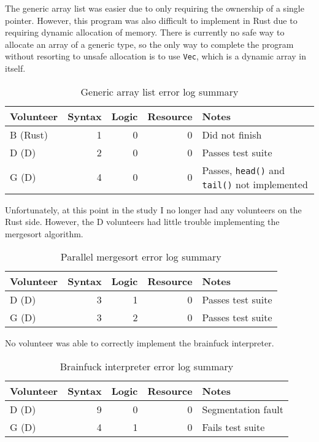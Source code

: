 \documentclass[finalcopy]{srpaper}
\begin{document}
The generic array list was easier due to only requiring the ownership of a
single pointer. However, this program was also difficult to implement in Rust
due to requiring dynamic allocation of memory. There is currently no safe way
to allocate an array of a generic type, so the only way to complete the program
without resorting to unsafe allocation is to use \texttt{Vec}, which is a
dynamic array in itself.

\begin{table}[h]
\centering
\begin{tabular}{lrrrp{5cm}}
\toprule
Volunteer & Syntax & Logic & Resource & Notes \\
\midrule
B (Rust) & 1 & 0 & 0 & Did not finish \\
D (D) & 2 & 0 & 0 & Passes test suite \\
G (D) & 4 & 0 & 0 & Passes, \texttt{head()} and \texttt{tail()} not implemented \\
\bottomrule
\end{tabular}
\caption{Generic array list error log summary}
\label{tab:genericarraylist}
\end{table}

Unfortunately, at this point in the study I no longer had any volunteers on
the Rust side. However, the D volunteers had little trouble implementing the
mergesort algorithm.

\begin{table}[h]
\centering
\begin{tabular}{lrrrp{5cm}}
\toprule
Volunteer & Syntax & Logic & Resource & Notes \\
\midrule
D (D) & 3 & 1 & 0 & Passes test suite \\
G (D) & 3 & 2 & 0 & Passes test suite \\
\bottomrule
\end{tabular}
\caption{Parallel mergesort error log summary}
\label{tab:parallelmergesort}
\end{table}

No volunteer was able to correctly implement the brainfuck interpreter.

\begin{table}[h]
\centering
\begin{tabular}{lrrrp{5cm}}
\toprule
Volunteer & Syntax & Logic & Resource & Notes \\
\midrule
D (D) & 9 & 0 & 0 & Segmentation fault \\
G (D) & 4 & 1 & 0 & Fails test suite \\
\bottomrule
\end{tabular}
\caption{Brainfuck interpreter error log summary}
\label{tab:brainfuckinterpreter}
\end{table}
\end{document}
